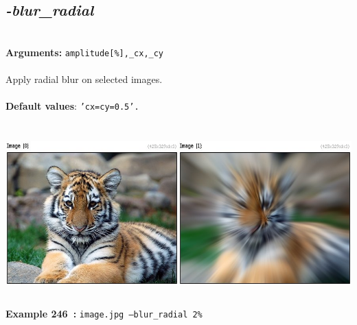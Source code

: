 \documentclass[a4paper,11pt,twoside]{book}
\begin{document}
\subsection{\emph{-blur\_radial} }\vspace*{-0.5em}
~\\\textbf{Arguments: } 
{\small \texttt{amplitude[\%],\_cx,\_cy}}\\~\\
Apply radial blur on selected images.
~\\~\\\textbf{Default values}: {\small \texttt{'cx=cy=0.5'.}}
\begin{center}\includegraphics[keepaspectratio=true,height=7cm,width=\textwidth]{img/gmic_def246.jpg}\\
{\footnotesize \textbf{Example 246~:} \texttt{image.jpg --blur\_radial 2\%}}
\end{center}
\end{document}
